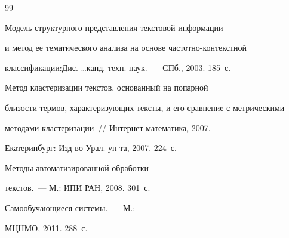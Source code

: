 {{\begin{thebibliography}{99}

 Модель структурного представления текс\-то\-вой информации 

и метод ее тематического анализа на основе час\-тот\-но-кон\-текст\-ной 

классификации:\linebreak Дис. \ldots  канд. техн. наук.~--- СПб., 2003. 185~с.






 Метод кластеризации текстов, основанный на попарной 

близости тер\-мов, характеризующих тексты, и его сравнение с метрическими 

методами клас\-те\-ри\-за\-ции~/\!\!/ Ин\-тер\-нет-ма\-те\-ма\-ти\-ка, 2007.~--- 

Екатеринбург: Изд-во Урал. ун-та, 2007. 224~с.

 


 Методы автоматизированной обработки 

текс\-тов.~--- М.: ИПИ РАН, 2008. 301~с.







 \label{end\stat}

 


 Самообучающиеся сис\-те\-мы.~--- М.: 

\mbox{МЦНМО}, 2011. 288~с.

 \end{thebibliography}

}

}

     

